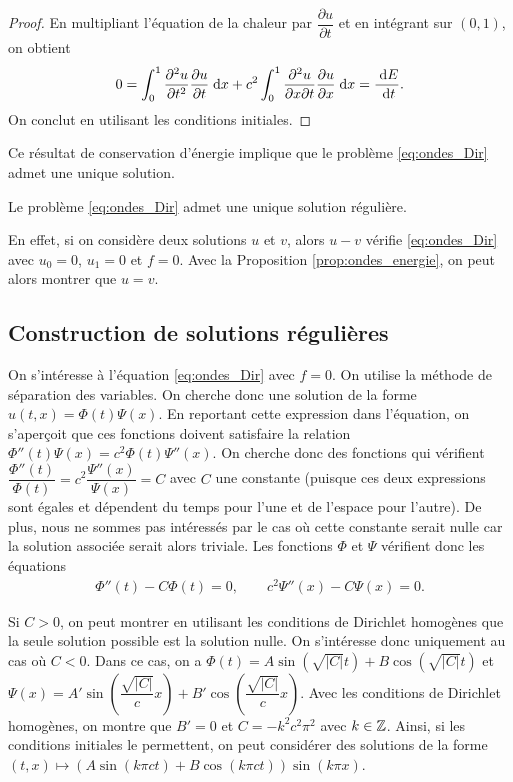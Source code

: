 \documentclass[12pt,a4paper,twoside]{article}
\begin{document}
\begin{proof}
  En multipliant l'\'equation de la chaleur par $\dfrac{\partial u}{\partial t}$
  et en int\'egrant sur $(0,1)$, on obtient
  \begin{align*}
    0 = 
    \int_0^1 \dfrac{\partial^2 u}{\partial t^2} \dfrac{\partial u}{\partial t} \;\mathrm{d} x
    + c^2 
    \int_0^1 \dfrac{\partial^2 u}{\partial x \partial t} \dfrac{\partial u}{\partial x} \;\mathrm{d} x
    = \dfrac{\;\mathrm{d} E}{\;\mathrm{d} t} .
  \end{align*}
  On conclut en utilisant les conditions initiales.
\end{proof}

Ce r\'esultat de conservation d'\'energie implique que le probl\`eme 
\eqref{eq:ondes_Dir} admet une unique solution.
\begin{corrolary}
  Le probl\`eme \eqref{eq:ondes_Dir} admet une unique solution r\'eguli\`ere.
\end{corrolary}
En effet, si on consid\`ere deux solutions $u$ et $v$,
alors $u-v$ v\'erifie \eqref{eq:ondes_Dir} avec $u_0 = 0$, $u_1 = 0$ et $f=0$. 
Avec la Proposition \ref{prop:ondes_energie}, on peut alors
montrer que $u=v$.

\subsection{Construction de solutions r\'eguli\`eres}

On s'int\'eresse \`a l'\'equation \eqref{eq:ondes_Dir} avec $f = 0$.
On utilise la m\'ethode de s\'eparation des variables.
On cherche donc une solution de la forme $u(t,x) = \Phi(t) \Psi(x)$.
En reportant cette expression dans l'\'equation, on s'aper\c{c}oit 
que ces fonctions doivent satisfaire la relation
$\Phi''(t) \Psi(x) = c^2 \Phi(t) \Psi''(x)$.
On cherche donc des fonctions qui v\'erifient
$\dfrac{\Phi''(t)}{\Phi(t)} = c^2 \dfrac{\Psi''(x)}{\Psi(x)} = C$
avec $C$ une constante (puisque ces deux expressions sont \'egales 
et d\'ependent du temps pour l'une et de l'espace pour l'autre).
De plus, nous ne sommes pas int\'eress\'es par le cas o\`u cette
constante serait nulle car la solution associ\'ee serait alors triviale.
Les fonctions $\Phi$ et $\Psi$ v\'erifient donc les \'equations
\begin{align*}
  \Phi''(t) - C \Phi(t) = 0 , 
  \qquad
  c^2 \Psi''(x) - C \Psi(x) = 0 .
\end{align*}

Si $C > 0$, on peut montrer en utilisant les conditions de Dirichlet homog\`enes
que la seule solution possible est la solution nulle.
On s'int\'eresse donc uniquement au cas o\`u $C < 0$.
Dans ce cas, on a $\Phi(t) = A \sin(\sqrt{|C|} t) + B \cos(\sqrt{|C|} t)$
et $\Psi(x) = A' \sin(\dfrac{\sqrt{|C|}}{c} x) + B' \cos(\dfrac{\sqrt{|C|}}{c} x)$.
Avec les conditions de Dirichlet homog\`enes, on montre
que $B' = 0$ et $C = - k^2 c^2 \pi^2$ avec $k \in \mathbb{Z}$.
Ainsi, si les conditions initiales le permettent, on peut consid\'erer
des solutions de la forme
$(t,x) \mapsto (A \sin(k\pi c t) + B \cos(k\pi c t)) \sin(k \pi x)$.
\end{document}
